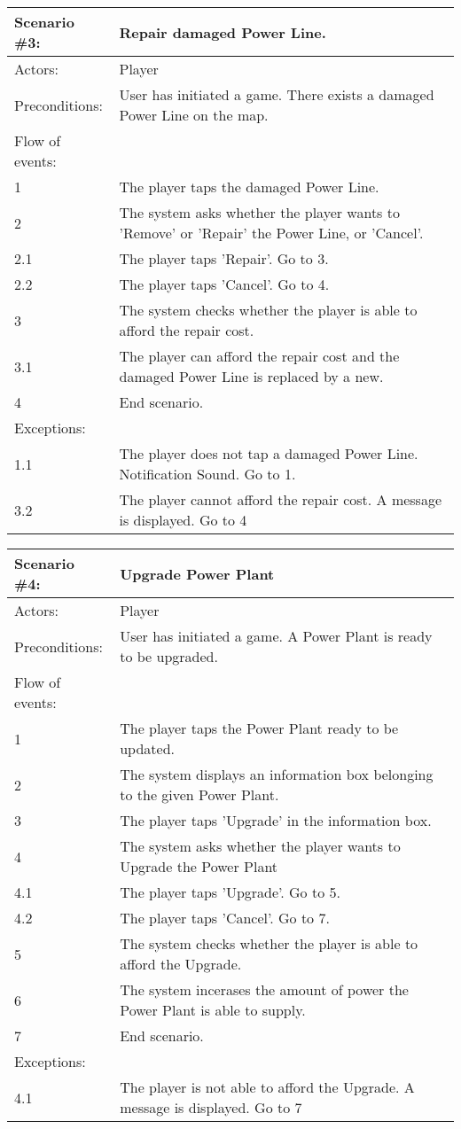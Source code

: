 \begin{tabular}{| l | p{10cm} |}
	\hline
	{\bf Scenario \#3:} & {\bf Repair damaged Power Line.} \\ \hline
	Actors: & Player \\ \hline
	Preconditions: & User has initiated a game. There exists a damaged Power Line on the map. \\ \hline
	Flow of events: & \\ \hline
	1 & The player taps the damaged Power Line. \\ \hline
	2 & The system asks whether the player wants to 'Remove' or 'Repair' the Power Line, or 'Cancel'. \\ \hline
	2.1 & The player taps 'Repair'. Go to 3. \\ \hline
	2.2 & The player taps 'Cancel'. Go to 4. \\ \hline
	3 & The system checks whether the player is able to afford the repair cost. \\ \hline
	3.1 & The player can afford the repair cost and the damaged Power Line is replaced by a new. \\ \hline
	4 & End scenario. \\ \hline
	Exceptions: & \\ \hline
	1.1 & The player does not tap a damaged Power Line. Notification Sound. Go to 1. \\ \hline
	3.2 & The player cannot afford the repair cost. A message is displayed. Go to 4 \\ \hline
\end{tabular}

\begin{tabular}{| l | p{10cm} |}
	\hline
	{\bf Scenario \#4:} & {\bf Upgrade Power Plant} \\ \hline
	Actors: & Player \\ \hline
	Preconditions: & User has initiated a game. A Power Plant is ready to be upgraded. \\ \hline
	Flow of events: & \\ \hline
	1 & The player taps the Power Plant ready to be updated. \\ \hline
	2 & The system displays an information box belonging to the given Power Plant. \\ \hline
	3 & The player taps 'Upgrade' in the information box. \\ \hline
	4 & The system asks whether the player wants to Upgrade the Power Plant \\ \hline
	4.1 & The player taps 'Upgrade'. Go to 5. \\ \hline
	4.2 & The player taps 'Cancel'. Go to 7. \\ \hline
	5 & The system checks whether the player is able to afford the Upgrade. \\ \hline
	6 & The system incerases the amount of power the Power Plant is able to supply. \\ \hline
	7 & End scenario. \\ \hline
	Exceptions: & \\ \hline
	4.1 & The player is not able to afford the Upgrade. A message is displayed. Go to 7 \\ \hline 
\end{tabular}

